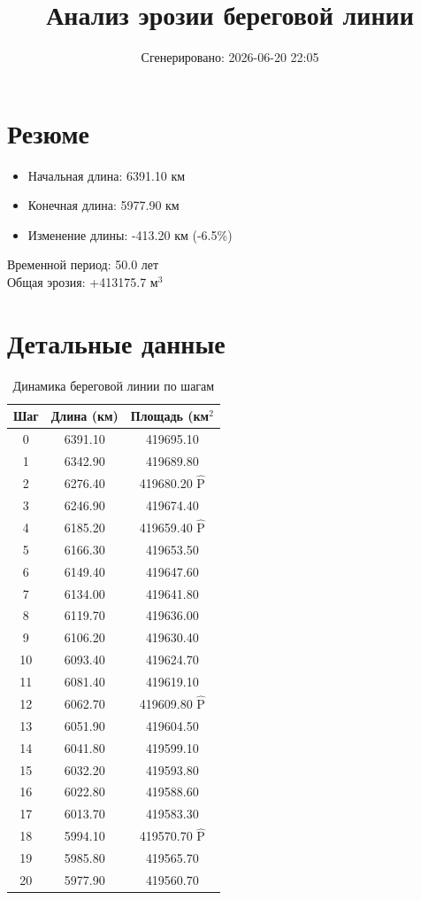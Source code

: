 \documentclass{article}
\title{Анализ эрозии береговой линии}
\author{Сгенерировано: 2026-06-20 22:05}
\date{}
\begin{document}
\maketitle

\section{Резюме}
\begin{itemize}
  \item Начальная длина: 6391.10 км
  \item Конечная длина: 5977.90 км
  \item Изменение длины: -413.20 км (-6.5\%)
\end{itemize}
Временной период: 50.0 лет\\

Общая эрозия: +413175.7 м$^3$\\

\section{Детальные данные}

\begin{table}[h]
\centering
\begin{tabular}{|c|c|c|}
\hline
Шаг & Длина (км) & Площадь (км$^2$ \\ 
\hline
0 & 6391.10 & 419695.10 \\ 
\hline
1 & 6342.90 & 419689.80 \\ 
\hline
2 & 6276.40 & 419680.20 $\hat{\text{P}}$ \\ 
\hline
3 & 6246.90 & 419674.40 \\ 
\hline
4 & 6185.20 & 419659.40 $\hat{\text{P}}$ \\ 
\hline
5 & 6166.30 & 419653.50 \\ 
\hline
6 & 6149.40 & 419647.60 \\ 
\hline
7 & 6134.00 & 419641.80 \\ 
\hline
8 & 6119.70 & 419636.00 \\ 
\hline
9 & 6106.20 & 419630.40 \\ 
\hline
10 & 6093.40 & 419624.70 \\ 
\hline
11 & 6081.40 & 419619.10 \\ 
\hline
12 & 6062.70 & 419609.80 $\hat{\text{P}}$ \\ 
\hline
13 & 6051.90 & 419604.50 \\ 
\hline
14 & 6041.80 & 419599.10 \\ 
\hline
15 & 6032.20 & 419593.80 \\ 
\hline
16 & 6022.80 & 419588.60 \\ 
\hline
17 & 6013.70 & 419583.30 \\ 
\hline
18 & 5994.10 & 419570.70 $\hat{\text{P}}$ \\ 
\hline
19 & 5985.80 & 419565.70 \\ 
\hline
20 & 5977.90 & 419560.70 \\ 
\hline
\end{tabular}
\caption{Динамика береговой линии по шагам}
\end{table}
\end{document}
